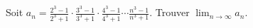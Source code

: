 Soit $a_n = \frac{2^3-1}{2^3+1} \cdot \frac{3^3-1}{3^3+1} \cdot \frac{4^3-1}{4^3+1} \cdots \frac{n^3-1}{n^3+1}$. Trouver $\lim_{n\to\infty} a_n$.
